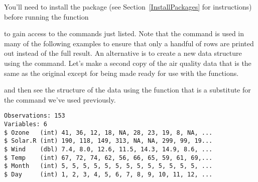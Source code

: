 You'll need to install the package (see Section~\ref{InstallPackages} for instructions) before running the function 
\begin{knitrout}
\color{fgcolor}\begin{kframe}
\begin{alltt}
\hlstd{> }
\end{alltt}


{\ttfamily\noindent\color{warningcolor}{Warning: package 'dplyr' was built under R version 3.3.1}}

{\ttfamily\noindent\itshape\color{messagecolor}{\\Attaching package: 'dplyr'}}

{\ttfamily\noindent\itshape\color{messagecolor}{The following objects are masked from 'package:stats':

\ \ \ \ filter, lag}}

{\ttfamily\noindent\itshape\color{messagecolor}{The following objects are masked from 'package:base':

\ \ \ \ intersect, setdiff, setequal, union}}\end{kframe}
\end{knitrout}
to gain access to the commands just listed. Note that the  command is used in many of the following examples to ensure that only a handful of rows are printed out instead of the full result. An alternative is to create a new data structure using the  command. Let's make a second copy of the air quality data that is the same as the original except for being made ready for use with the  functions. 
\begin{knitrout}
\color{fgcolor}\begin{kframe}
\begin{alltt}
\hlstd{> } \hlkwb{=} 
\end{alltt}
\end{kframe}
\end{knitrout}
and then see the structure of the data using the  function that is a substitute for the  command we've used previously. 
\begin{knitrout}
\color{fgcolor}\begin{kframe}
\begin{alltt}
\hlstd{> }
\end{alltt}
\begin{verbatim}
Observations: 153
Variables: 6
$ Ozone   (int) 41, 36, 12, 18, NA, 28, 23, 19, 8, NA, ...
$ Solar.R (int) 190, 118, 149, 313, NA, NA, 299, 99, 19...
$ Wind    (dbl) 7.4, 8.0, 12.6, 11.5, 14.3, 14.9, 8.6, ...
$ Temp    (int) 67, 72, 74, 62, 56, 66, 65, 59, 61, 69,...
$ Month   (int) 5, 5, 5, 5, 5, 5, 5, 5, 5, 5, 5, 5, 5, ...
$ Day     (int) 1, 2, 3, 4, 5, 6, 7, 8, 9, 10, 11, 12, ...
\end{verbatim}
\end{kframe}
\end{knitrout}
